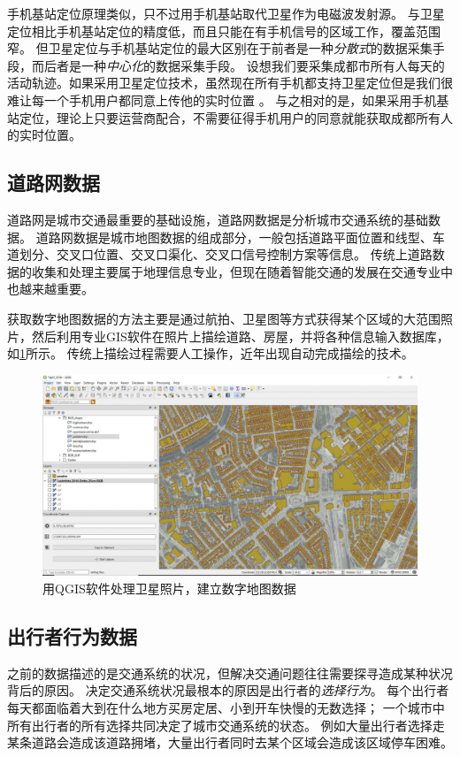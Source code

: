 手机基站定位原理类似，只不过用手机基站取代卫星作为电磁波发射源。
与卫星定位相比手机基站定位的精度低，而且只能在有手机信号的区域工作，覆盖范围窄。
但卫星定位与手机基站定位的最大区别在于前者是一种\emph{分散式}的数据采集手段，而后者是一种\emph{中心化}的数据采集手段。
设想我们要采集成都市所有人每天的活动轨迹。如果采用卫星定位技术，虽然现在所有手机都支持卫星定位但是我们很难让每一个手机用户都同意上传他的实时位置
。
与之相对的是，如果采用手机基站定位，理论上只要运营商配合，不需要征得手机用户的同意就能获取成都所有人的实时位置。

\subsection{道路网数据}
道路网是城市交通最重要的基础设施，道路网数据是分析城市交通系统的基础数据。
道路网数据是城市地图数据的组成部分，一般包括道路平面位置和线型、车道划分、交叉口位置、交叉口渠化、交叉口信号控制方案等信息。
传统上道路数据的收集和处理主要属于地理信息专业，但现在随着智能交通的发展在交通专业中也越来越重要。

获取数字地图数据的方法主要是通过航拍、卫星图等方式获得某个区域的大范围照片，然后利用专业GIS软件在照片上描绘道路、房屋，并将各种信息输入数据库，如\cref{fig:gis-data-collection}所示。
传统上描绘过程需要人工操作，近年出现自动完成描绘的技术。
\begin{figure}
    \includegraphics[width=\linewidth]{images/gis-data-collection.jpg}
    \caption{用QGIS软件处理卫星照片，建立数字地图数据}
    \label{fig:gis-data-collection}
\end{figure}

\subsection{出行者行为数据}
之前的数据描述的是交通系统的状况，但解决交通问题往往需要探寻造成某种状况背后的原因。
决定交通系统状况最根本的原因是出行者的\emph{选择行为}。
每个出行者每天都面临着大到在什么地方买房定居、小到开车快慢的无数选择；
一个城市中所有出行者的所有选择共同决定了城市交通系统的状态。
例如大量出行者选择走某条道路会造成该道路拥堵，大量出行者同时去某个区域会造成该区域停车困难。

